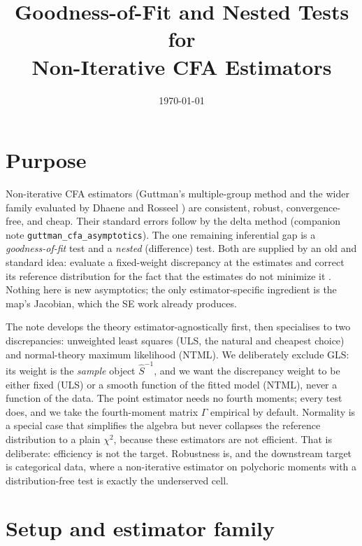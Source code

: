 \documentclass[11pt]{article}
\title{Goodness-of-Fit and Nested Tests for\\ Non-Iterative CFA Estimators}
\author{}
\date{\today}
\newcommand{\Ninv}{^{-1}}
\theoremstyle{plain}
\theoremstyle{definition}
\theoremstyle{remark}
\begin{document}
\maketitle

\section*{Purpose}

Non-iterative CFA estimators (Guttman's multiple-group method
\cite{guttman1952} and the wider family evaluated by Dhaene and Rosseel
\cite{dhaene2024}) are consistent, robust, convergence-free, and cheap. Their
standard errors follow by the delta method (companion note
\texttt{guttman\_cfa\_asymptotics}). The one remaining inferential gap is a
\emph{goodness-of-fit} test and a \emph{nested} (difference) test. Both are
supplied by an old and standard idea: evaluate a fixed-weight discrepancy at the
estimates and correct its reference distribution for the fact that the estimates
do not minimize it \cite{browne1984,shapiro1986,satorra1989}. Nothing here is
new asymptotics; the only estimator-specific ingredient is the map's Jacobian,
which the SE work already produces.

The note develops the theory estimator-agnostically first, then specialises to
two discrepancies: unweighted least squares (ULS, the natural and cheapest
choice) and normal-theory maximum likelihood (NTML). We deliberately exclude
GLS: its weight is the \emph{sample} object $\widehat S\Ninv$, and we want the
discrepancy weight to be either fixed (ULS) or a smooth function of the fitted
model (NTML), never a function of the data. The point estimator needs no fourth
moments; every test does, and we take the fourth-moment matrix $\Gamma$
empirical by default. Normality is a special case that simplifies the algebra
but never collapses the reference distribution to a plain $\chi^2$, because these
estimators are not efficient. That is deliberate: efficiency is not the target.
Robustness is, and the downstream target is categorical data, where a
non-iterative estimator on polychoric moments with a distribution-free test is
exactly the underserved cell.

\section{Setup and estimator family}\label{sec:setup}
\end{document}
